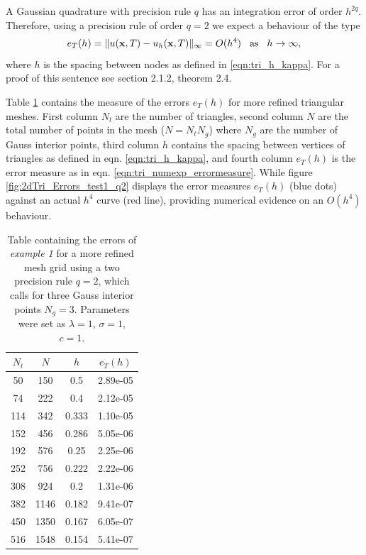 \documentclass{uonmathreport}
\begin{document}
A Gaussian quadrature with precision rule $q$ has an integration error of order $h^{2q}$. Therefore, using a precision rule of order $q=2$ we expect a behaviour of the type
\begin{equation}\label{eqn:tri_numexp_errormeasure2}
e_T(h) = \| u(\mathbf{x}, T) -  u_h(\mathbf{x}, T)\|_{\infty} = O(h^4) \hspace{3mm}
\textnormal{as} \hspace{3mm} h \rightarrow \infty,
\end{equation}
where $h$ is the spacing between nodes as defined in \ref{eqn:tri_h_kappa}. For a proof of this sentence see \cite{lima2015numerical} section 2.1.2, theorem 2.4.

Table \ref{table:2dTri_Errors_test1_q2} contains the measure of the errors $e_T(h)$ for more refined triangular meshes. First column $N_t$ are the number of triangles, second column $N$ are the total number of points in the mesh ($N = N_tN_g$) where $N_g$ are the number of Gauss interior points, third column $h$ contains the spacing between vertices of triangles as defined in eqn. \ref{eqn:tri_h_kappa}, and fourth column $e_T(h)$ is the error measure as in eqn. \ref{eqn:tri_numexp_errormeasure}. While figure \ref{fig:2dTri_Errors_test1_q2} displays the error measures $e_T(h)$ (blue dots) against an actual $h^4$ curve (red line), providing numerical evidence on an $O(h^4)$ behaviour.
\begin{table}[H]
	\centering
	\begin{tabular}{|c|c|c|c|}
		\hline
		$N_t$&$N$&$h$&$e_T(h)$\\
		\hline
		50&150&0.5&2.89e-05\\
		74&222&0.4&2.12e-05\\
		114&342&0.333&1.10e-05\\
		152&456&0.286&5.05e-06\\
		192&576&0.25&2.25e-06\\
		252&756&0.222&2.22e-06\\
		308&924&0.2&1.31e-06\\
		382&1146&0.182&9.41e-07\\
		450&1350&0.167&6.05e-07\\
		516&1548&0.154&5.41e-07\\
		\hline
	\end{tabular}
	\caption{Table containing the errors of \textit{example 1} for a more refined mesh grid using a two precision rule $q=2$, which calls for three Gauss interior points $N_g=3$. Parameters were set as $\lambda=1$, $\sigma=1$, $c=1$.}
	\label{table:2dTri_Errors_test1_q2}
\end{table}
\end{document}
